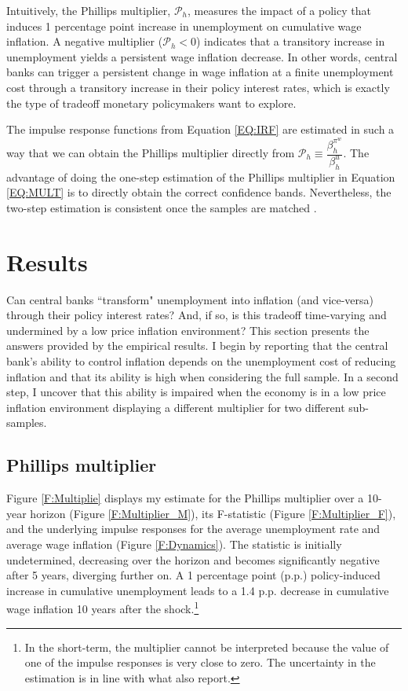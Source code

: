\documentclass[12pt]{article}
\begin{document}
Intuitively, the Phillips multiplier, $\mathcal{P}_h$, measures the impact of a policy that induces 1 percentage point increase in unemployment on cumulative wage inflation. A negative multiplier ($\mathcal{P}_h < 0$) indicates that a transitory increase in unemployment yields a persistent wage inflation decrease. In other words, central banks can trigger a persistent change in wage inflation at a finite unemployment cost through a transitory increase in their policy interest rates, which is exactly the type of tradeoff monetary policymakers want to explore.

The impulse response functions from Equation \eqref{EQ:IRF} are estimated in such a way that we can obtain the Phillips multiplier directly from $\mathcal{P}_h \equiv \dfrac{\beta_h^{\pi^w}}{\beta_h^{u}}$. The advantage of doing the one-step estimation of the Phillips multiplier in Equation \eqref{EQ:MULT} is to directly obtain the correct confidence bands. Nevertheless, the two-step estimation is consistent once the samples are matched \citep{Ramey2018}.


\section{Results \label{S_Results}}

Can central banks ``transform" unemployment into inflation (and vice-versa) through their policy interest rates? And, if so, is this tradeoff time-varying and undermined by a low price inflation environment? This section presents the answers provided by the empirical results. I begin by reporting that the central bank's ability to control inflation depends on the unemployment cost of reducing inflation and that its ability is high when considering the full sample. In a second step, I uncover that this ability is impaired when the economy is in a low price inflation environment displaying a different multiplier for two different sub-samples.

\subsection{Phillips multiplier}

Figure \ref{F:Multiplie} displays my estimate for the Phillips multiplier over a 10-year horizon (Figure \ref{F:Multiplier_M}), its F-statistic (Figure \ref{F:Multiplier_F}), and the underlying impulse responses for the average unemployment rate and average wage inflation (Figure \ref{F:Dynamics}). The statistic is initially undetermined, decreasing over the horizon and becomes significantly negative after 5 years, diverging further on. A 1 percentage point (p.p.) policy-induced increase in cumulative unemployment leads to a 1.4 p.p. decrease in cumulative wage inflation 10 years after the shock.\footnote{In the short-term, the multiplier cannot be interpreted because the value of one of the impulse responses is very close to zero. The uncertainty in the estimation is in line with what \cite{Barnichon2019} also report.}
\end{document}
